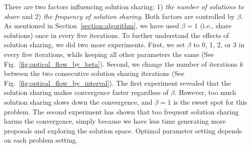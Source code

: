 There are two factors influencing solution sharing: 1) \textit{the
number of solutions to share} and 2) \textit{the frequency of solution
sharing}. Both factors are controlled by $\beta$. As mentioned in
Section~\ref{section:algorithm}, we have used $\beta = 1$ (i.e., share
solutions) once in every five iterations.  To further understand the
effects of solution sharing, we did two more experiments. First, we set
$\beta$ to 0, 1, 2, or 3 in every five iterations,
while keeping all other parameters the same (See
Fig.~\ref{fig:optical_flow_by_beta}).  Second, we change the number of
iterations $k$ between the two consecutive solution sharing iterations
(See Fig.~\ref{fig:optical_flow_by_interval}).  The first experiment
revealed that the solution sharing makes convergence faster regardless of
$\beta$.  However, too much solution sharing slows down the convergence,
and $\beta=1$ is the sweet spot for this problem.
%
%
The second experiment has shown that too frequent solution sharing
harms the convergence, simply because we have less time generating more
proposals and exploring the solution space.
Optimal parameter setting depends on each problem setting.



